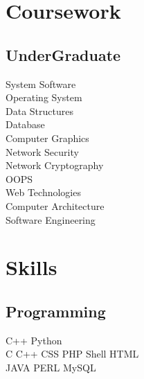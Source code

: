 \documentclass[]{deedy-resume-openfont}
\begin{document}
\begin{minipage}[t]{0.33\textwidth}

\section{Coursework}
\subsection{UnderGraduate}
System Software \\
Operating System \\
Data Structures \\
Database \\
Computer Graphics\\
Network Security\\
Network Cryptography\\
OOPS\\
Web Technologies\\
Computer Architecture \\
Software Engineering

\sectionsep



\section{Skills}
\subsection{Programming}
C++ \textbullet{}   Python \\ 
C \textbullet{} C++ \textbullet{} CSS \textbullet{} PHP \textbullet{}  Shell \textbullet{} HTML \\
JAVA \textbullet{} PERL \textbullet{}  MySQL
\sectionsep

%
%

\end{minipage} 
\hfill
\end{document}
